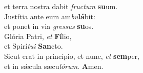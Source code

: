 \oddverse et terra nostra dabit \textit{fru}\textit{ctum} \textbf{su}um.\\
\evenverse Justítia ante eum am\textit{bu}\textbf{lá}bit:~\*\\
\evenverse et ponet in via \textit{gres}\textit{sus} \textbf{su}os.\\
\oddverse Glória Patri, \textit{et} \textbf{Fí}lio,~\*\\
\oddverse et Spirí\textit{tu}\textit{i} \textbf{San}cto.\\
\evenverse Sicut erat in princípio, et nunc, \textit{et} \textbf{sem}per,~\*\\
\evenverse et in sǽcula sæcu\textit{ló}\textit{rum}. \textbf{A}men.\\
